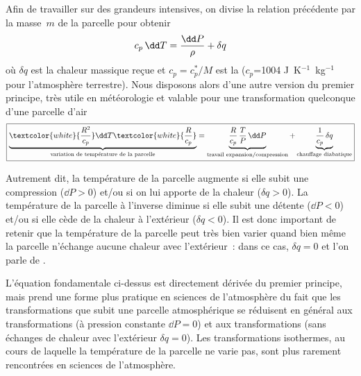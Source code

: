 \sk
Afin de travailler sur des grandeurs intensives, on divise la relation précédente par la masse~$m$ de la parcelle pour obtenir
\[ \EE \]
où $\delta q$ est la chaleur massique reçue et $c_p = c_p^* / M$ est la  ($c_p$=1004 J~K$^{-1}$~kg$^{-1}$ pour l'atmosphère terrestre). Nous disposons alors d'une autre version du premier principe, très utile en météorologie et valable pour une transformation quelconque d'une parcelle d'air
\[ \boxed{ \underbrace{\textcolor{white}{\frac{R^2}{c_p}} \dd T \textcolor{white}{\frac{R}{c_p}}}_{\text{variation de température de la parcelle}} = \underbrace{\frac{R}{c_p} \, \frac{T}{P} \, \dd P}_{\text{travail expansion/compression}} + \underbrace{\frac{1}{c_p} \, \delta q}_{\text{chauffage diabatique}} } \]

\sk
Autrement dit, la température de la parcelle augmente si elle subit une compression ($\dd P > 0$) et/ou si on lui apporte de la chaleur ($\delta q > 0$). La température de la parcelle à l'inverse diminue si elle subit une détente ($\dd P < 0$) et/ou si elle cède de la chaleur à l'extérieur ($\delta q < 0$). Il est donc important de retenir que la température de la parcelle peut très bien varier quand bien même la parcelle n'échange aucune chaleur avec l'extérieur~: dans ce cas, $\delta q = 0$ et l'on parle de . 

\sk
L'équation fondamentale ci-dessus est directement dérivée du premier principe, mais prend une forme plus pratique en sciences de l'atmosphère du fait que les transformations que subit une parcelle atmosphérique se réduisent en général aux transformations  (à pression constante $\dd P = 0$) et aux transformations  (sans échanges de chaleur avec l'extérieur $\delta q = 0$). Les transformations isothermes, au cours de laquelle la température de la parcelle ne varie pas, sont plus rarement rencontrées en sciences de l'atmosphère.


